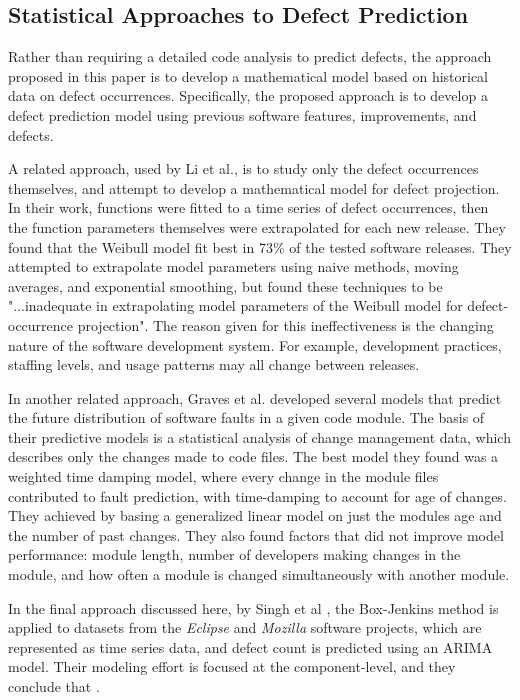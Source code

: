 \documentclass[a4paper]{scrartcl}
\begin{document}
\subsection*{Statistical Approaches to Defect Prediction}
Rather than requiring a detailed code analysis to predict defects, the approach proposed in this paper is to develop a mathematical model based on historical data on defect occurrences. Specifically, the proposed approach is to develop a defect prediction model using previous software features, improvements, and defects.

A related approach, used by Li et al.\cite{2004_li_emperical_eval}, is to study only the defect occurrences themselves, and attempt to develop a mathematical model for defect projection. In their work, functions were fitted to a time series of defect occurrences, then the function parameters themselves were extrapolated for each new release. They found that the Weibull model fit best in 73\% of the tested software releases. They attempted to extrapolate model parameters using naive methods, moving averages, and exponential smoothing, but found these techniques to be "...inadequate in extrapolating model parameters of the Weibull model for defect-occurrence projection". The reason given for this ineffectiveness is the changing nature of the software development system. For example, development practices, staffing levels, and usage patterns may all change between releases.

In another related approach, Graves et al.\cite{2000_graves_predicting} developed several models that predict the future distribution of software faults in a given code module. The basis of their predictive models is a statistical analysis of change management data, which describes only the changes made to code files. The best model they found was a weighted time damping model, where every change in the module files contributed to fault prediction, with time-damping to account for age of changes. They achieved  by basing a generalized linear model on just the modules age and the number of past changes. They also found factors that did not improve model performance: module length, number of developers making changes in the module, and how often a module is changed simultaneously with another module.

In the final approach discussed here, by Singh et al \cite{2010_singh_predicting}, the Box-Jenkins method is applied to datasets from the \textit{Eclipse} and \textit{Mozilla} software projects, which are represented as time series data, and defect count is predicted using an ARIMA model. Their modeling effort is focused at the component-level, and they conclude that .
\end{document}
